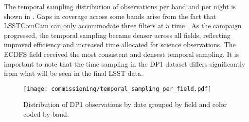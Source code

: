 The temporal sampling distribution of observations per band and per night is shown in .
Gaps in coverage across some bands arise from the fact that \gls{LSSTComCam} can only accommodate three filters at a time .
As the campaign progressed, the temporal sampling became denser across all fields, reflecting improved efficiency and increased time allocated for science observations.
The \gls{ECDFS} field received the most consistent and densest temporal sampling.
It is important to note that the time sampling in the \gls{DP1} dataset differs significantly from what will be seen in the final \gls{LSST} data.
\begin{figure*}[htb!]
\centering
\texttt{[image: commissioning/temporal\_sampling\_per\_field.pdf]}
\caption{Distribution of \gls{DP1} observations by date grouped by field and color coded by band.}
\label{fig:target_fields_temporal_sampling}
\vspace{0.1cm}
\end{figure*}

